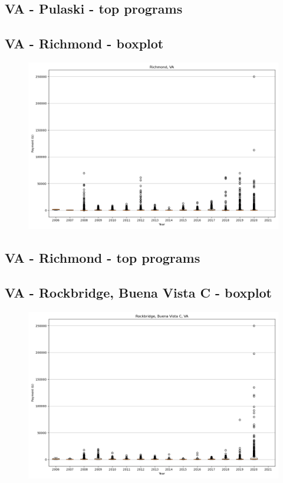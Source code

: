\subsection*{VA - Pulaski - top programs}

\newpage
\subsection*{VA - Richmond - boxplot}
\begin{figure}[h]
\centering
\includegraphics[width=7in]{../output/boxplots/counties/Richmond-VA_boxplot.png}
\end{figure}


\subsection*{VA - Richmond - top programs}

\newpage
\subsection*{VA - Rockbridge, Buena Vista C - boxplot}
\begin{figure}[h]
\centering
\includegraphics[width=7in]{../output/boxplots/counties/Rockbridge, Buena Vista C-VA_boxplot.png}
\end{figure}


